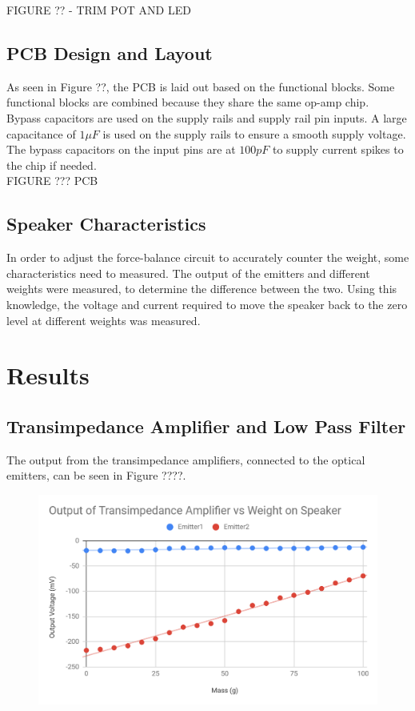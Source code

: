 \documentclass[12pt]{article}
\begin{document}
	FIGURE ?? - TRIM POT AND LED
	
	\subsection{PCB Design and Layout}
	As seen in Figure ??, the PCB is laid out based on the functional blocks. Some functional blocks are combined because they share the same op-amp chip.\\ 
	
	Bypass capacitors are used on the supply rails and supply rail pin inputs. A large capacitance of $1\mu F$ is used on the supply rails to ensure a smooth supply voltage. The bypass capacitors on the input pins are at $100pF$ to supply current spikes to the chip if needed.\\
	
	FIGURE ??? PCB
	
	\subsection{Speaker Characteristics}
	In order to adjust the force-balance circuit to accurately counter the weight, some characteristics need to measured. The output of the emitters and different weights were measured, to determine the difference between the two. Using this knowledge, the voltage and current required to move the speaker back to the zero level at different weights was measured. 
	
	\section{Results}
		\subsection{Transimpedance Amplifier and Low Pass Filter}
		The output from the transimpedance amplifiers, connected to the optical emitters, can be seen in Figure ????.
		
		\begin{figure}[h]
			\centering
			\includegraphics[width=\columnwidth]{transimpedance_results}
			\caption{}
		\end{figure}
		
\end{document}
